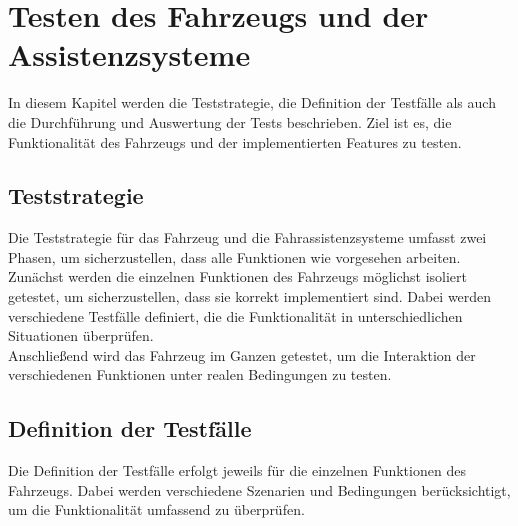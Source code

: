 \chapter{Testen des Fahrzeugs und der Assistenzsysteme}
\label{chap:testing}
In diesem Kapitel werden die Teststrategie, die Definition der Testfälle als auch die Durchführung und Auswertung der Tests beschrieben. Ziel ist es, die Funktionalität des Fahrzeugs und der implementierten Features zu testen.

\section{Teststrategie} 
Die Teststrategie für das Fahrzeug und die Fahrassistenzsysteme umfasst zwei Phasen, um sicherzustellen, dass alle Funktionen wie vorgesehen arbeiten. Zunächst werden die einzelnen Funktionen des Fahrzeugs möglichst isoliert getestet, um sicherzustellen, dass sie korrekt implementiert sind. Dabei werden verschiedene Testfälle definiert, die die Funktionalität in unterschiedlichen Situationen überprüfen. \\
Anschließend wird das Fahrzeug im Ganzen getestet, um die Interaktion der verschiedenen Funktionen unter realen Bedingungen zu testen. 

\section{Definition der Testfälle}
Die Definition der Testfälle erfolgt jeweils für die einzelnen Funktionen des Fahrzeugs. Dabei werden verschiedene Szenarien und Bedingungen berücksichtigt, um die Funktionalität umfassend zu überprüfen.

